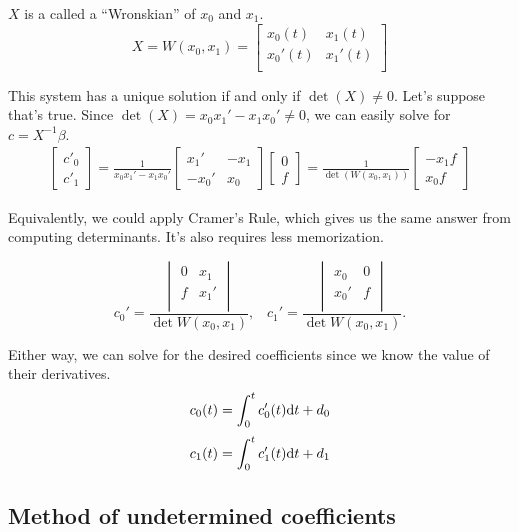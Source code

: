  \begin{note}
	$X$ is a called a ``Wronskian'' of $x_0$ and $x_1$. 
	\[ X = W(x_0, x_1) = \begin{bmatrix}
		x_0(t) & x_1(t) \\
		x_0'(t) & x_1'(t) \\
	\end{bmatrix} \]
\end{note}

This system has a unique solution if and only if $\det(X) \neq 0$. Let's suppose that's true. Since $\det(X) = x_0 x_1' - x_1 x_0' \neq 0$, we can easily solve for $c = X^{-1}\beta$. 
\begin{gather*}
	\begin{bmatrix}
		c'_0 \\ c'_1
	\end{bmatrix} = \frac{1}{x_0 x_1' - x_1 x_0'} 
	\begin{bmatrix}
		x_1' & -x_1 \\
		-x_0'& x_0 
	\end{bmatrix} 
	\begin{bmatrix}
		0 \\ f
	\end{bmatrix} = \frac{1}{\det(W(x_0, x_1))} \begin{bmatrix}
		-x_1 f \\
		x_0 f
	\end{bmatrix}
\end{gather*}

Equivalently, we could apply Cramer's Rule, which gives us the same answer from computing determinants. It's also requires less memorization. 

\[ c_0' = \frac{
	\begin{vmatrix}
	 0 & x_1 \\
	 f & x_1' \\
	\end{vmatrix}}
	{\det W(x_0, x_1)}, \;\;\;
	c_1' = \frac{
		\begin{vmatrix}
			x_0 & 0 \\
			x_0' & f \\
		\end{vmatrix}}
		{\det W(x_0, x_1)}.\]

Either way, we can solve for the desired coefficients since we know the value of their derivatives. 
\[ c_0(t) =  \int_0^t c_0'(t) \text{d} t  +  d_0 \]
\[ c_1(t) =  \int_0^t c_1'(t) \text{d} t  +  d_1 \]


\subsection{Method of undetermined coefficients}

